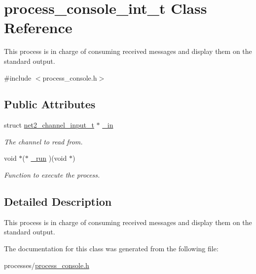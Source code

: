 \hypertarget{structprocess__console__int__t}{\section{process\-\_\-console\-\_\-int\-\_\-t Class Reference}
\label{structprocess__console__int__t}
}


This process is in charge of consuming received messages and display them on the standard output.  




{\ttfamily \#include $<$process\-\_\-console.\-h$>$}

\subsection*{Public Attributes}
\begin{DoxyCompactItemize}
\item 
\hypertarget{structprocess__console__int__t_a2b11271b3a29fed457b30fd477873daf}{struct \hyperlink{structnet2__channel__input__t}{net2\-\_\-channel\-\_\-input\-\_\-t} $\ast$ \hyperlink{structprocess__console__int__t_a2b11271b3a29fed457b30fd477873daf}{\-\_\-in}}\label{structprocess__console__int__t_a2b11271b3a29fed457b30fd477873daf}

\begin{DoxyCompactList}\small\item\em The channel to read from. \end{DoxyCompactList}\item 
\hypertarget{structprocess__console__int__t_ae2348efd72d818e7521fc8e630e69e70}{void $\ast$($\ast$ \hyperlink{structprocess__console__int__t_ae2348efd72d818e7521fc8e630e69e70}{\-\_\-run} )(void $\ast$)}\label{structprocess__console__int__t_ae2348efd72d818e7521fc8e630e69e70}

\begin{DoxyCompactList}\small\item\em Function to execute the process. \end{DoxyCompactList}\end{DoxyCompactItemize}


\subsection{Detailed Description}
This process is in charge of consuming received messages and display them on the standard output. 

The documentation for this class was generated from the following file\-:\begin{DoxyCompactItemize}
\item 
processes/\hyperlink{process__console_8h}{process\-\_\-console.\-h}\end{DoxyCompactItemize}
